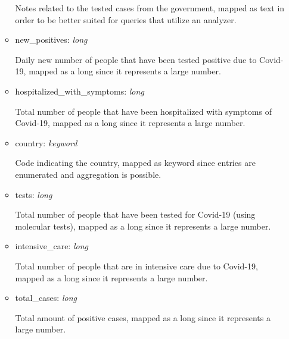 \documentclass[12pt, a4paper]{article}
\begin{document}
\begin{itemize}
\begin{itemize}
        \begin{footnotesize}
          Notes related to the tested cases from the government, mapped as text in order
          to be better suited for queries that utilize an analyzer.
        \end{footnotesize}
      \item new\_positives: \emph{long} \\
        \begin{footnotesize}
          Daily new number of people that have been tested positive due to Covid-19, 
          mapped as a long since it represents a large number.
        \end{footnotesize}
      \item hospitalized\_with\_symptoms: \emph{long} \\
        \begin{footnotesize}
          Total number of people that have been hospitalized with symptoms of Covid-19,
          mapped as a long since it represents a large number.
        \end{footnotesize}
      \item country: \emph{keyword} \\
        \begin{footnotesize}
          Code indicating the country, mapped as keyword since entries are 
          enumerated and aggregation is possible.
        \end{footnotesize}
      \item tests: \emph{long} \\
        \begin{footnotesize}
          Total number of people that have been tested for Covid-19 (using molecular 
          tests), mapped as a long since it represents a large number.
        \end{footnotesize}
      \item intensive\_care: \emph{long} \\
        \begin{footnotesize}
          Total number of people that are in intensive care due to Covid-19, mapped as 
          a long since it represents a large number.
        \end{footnotesize}
      \item total\_cases: \emph{long} \\
        \begin{footnotesize}
          Total amount of positive cases, mapped as a long since it represents a large 
          number.

\end{footnotesize}
\end{itemize}
\end{itemize}
\end{document}
